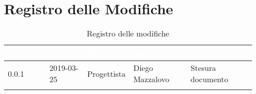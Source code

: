 \newpage

\section*{Registro delle Modifiche}

\begin{center}
\begin{longtable}[c]{|m{}|m{}|m{}|m{}|p{}|}
\hline
\rowcolor{bluelogo}\textbf{\textcolor{white}{Versione}} & \textbf{\textcolor{white}{Data}} & \textbf{\textcolor{white}{Ruolo}} & \textbf{\textcolor{white}{Autore}} & \textbf{\textcolor{white}{Descrizione}}\\
\hline \hline
\endfirsthead
0.0.1 & 2019-03-25 & Progettista & Diego Mazzalovo & Stesura documento \\
\hline
\caption{Registro delle modifiche}
\end{longtable}
\end{center}
